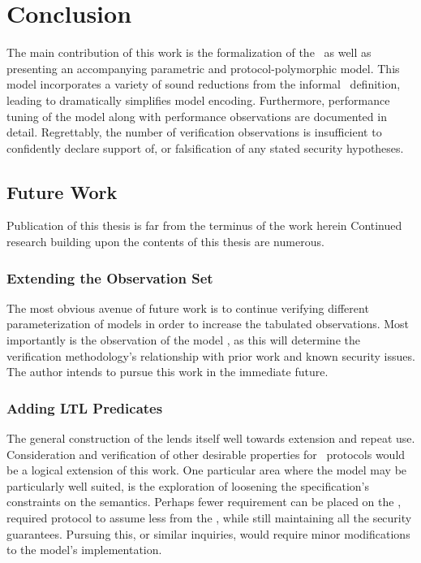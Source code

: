 \hypertarget{sec:conclusion}{%
\chapter{Conclusion}\label{sec:conclusion}}

The main contribution of this work is the formalization of the \CGKAsec\ as well as presenting an accompanying parametric and protocol-polymorphic  model.
This \CGKAmod{}{}{} model incorporates a variety of sound reductions from the informal \CGKAsec\ definition, leading to dramatically simplifies model encoding.
Furthermore, performance tuning of the model along with performance observations are documented in detail.
Regrettably, the number of verification observations is insufficient to confidently declare support of, or falsification of any stated security hypotheses.


\hypertarget{sec:future-work}{%
\section{Future Work}\label{sec:future-work}}

Publication of this thesis is far from the terminus of the work herein
Continued research building upon the contents of this thesis are numerous.


\hypertarget{sec:more-observations}{%
\subsection{Extending the Observation Set}\label{sec:more-observations}}

The most obvious avenue of future work is to continue verifying different parameterization of  models in order to increase the tabulated observations.
Most importantly is the observation of the model , as this will determine the verification methodology's relationship with prior work and known security issues.
The author intends to pursue this work in the immediate future.


\hypertarget{sec:more-predicates}{%
\subsection{Adding LTL Predicates}\label{sec:more-predicates}}

The general construction of the  lends itself well towards extension and repeat use.
Consideration and verification of other desirable properties for \CGKAdef\ protocols would be a logical extension of this work.
One particular area where the  model may be particularly well suited, is the exploration of loosening the  specification's constraints on the  semantics.
Perhaps fewer requirement can be placed on the , required protocol to assume less from the , while still maintaining all the  security guarantees.
Pursuing this, or similar inquiries, would require minor modifications to the  model's implementation.

